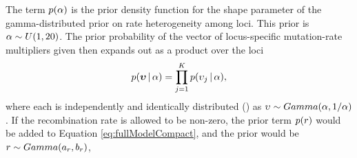 \begin{linenomath}
The term $p(\alpha)$ is the prior density
function for the shape parameter of the gamma-distributed prior on
rate heterogeneity among loci.
This prior is $\alpha \sim U(1, 20)$.
The prior probability of the vector of locus-specific mutation-rate multipliers
given \locusRateHetShapeParameter then expands out as a product over
the loci
\begin{equation}
    p(\boldsymbol{\upsilon} \,|\, \alpha) =
    \prod_{j=1}^{K}
    p(\upsilon_{j} \,|\, \alpha),
    \label{eq:locusRateHetPrior}
\end{equation}
where each \locusMutationRateScalar{} is independently and identically
distributed (\iid) as
$\upsilon_{} \sim Gamma(\alpha,
1/\alpha)$.
If the recombination rate \recombinationRate is allowed to be non-zero, the
prior term $p(r)$ would be added to Equation
\ref{eq:fullModelCompact}, and the prior would be $r \sim
Gamma(a_{r}, b_{r})$,
\end{linenomath}

